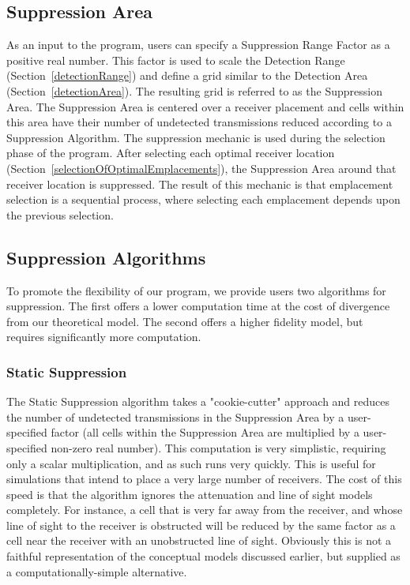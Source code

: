 \subsection{Suppression Area}
As an input to the program, users can specify a Suppression Range Factor as a positive real number.  This factor is used to scale the Detection Range (Section~\ref{detectionRange}) and define a grid similar to the Detection Area (Section~\ref{detectionArea}).  The resulting grid is referred to as the Suppression Area.  The Suppression Area is centered over a receiver placement and cells within this area have their number of undetected transmissions reduced according to a Suppression Algorithm.  The suppression mechanic is used during the selection phase of the program.  After selecting each optimal receiver location (Section~\ref{selectionOfOptimalEmplacements}), the Suppression Area around that receiver location is suppressed.  The result of this mechanic is that emplacement selection is a sequential process, where selecting each emplacement depends upon the previous selection.  

\subsection{Suppression Algorithms}
\label{suppressionAlgorithms}
To promote the flexibility of our program, we provide users two algorithms for suppression.  The first offers a lower computation time at the cost of divergence from our theoretical model.  The second offers a higher fidelity model, but requires significantly more computation.

\subsubsection{Static Suppression}
\label{staticSuppression}
The Static Suppression algorithm takes a "cookie-cutter" approach and reduces the number of undetected transmissions in the Suppression Area by a user-specified factor (all cells within the Suppression Area are multiplied by a user-specified non-zero real number).  This computation is very simplistic, requiring only a scalar multiplication, and as such runs very quickly.  This is useful for simulations that intend to place a very large number of receivers.  The cost of this speed is that the algorithm ignores the attenuation and line of sight models completely.  For instance, a cell that is very far away from the receiver, and whose line of sight to the receiver is obstructed will be reduced by the same factor as a cell near the receiver with an unobstructed line of sight.  Obviously this is not a faithful representation of the conceptual models discussed earlier, but supplied as a computationally-simple alternative.

